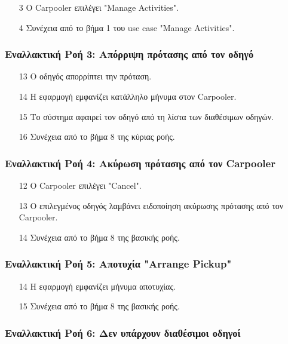 \begin{enumerate}
    \item[3] O Carpooler επιλέγει "Manage Activities".
    \item[4] Συνέχεια από το βήμα 1 του use case "Manage Activities".
\end{enumerate}

\subsubsection{Εναλλακτική Ροή 3: Απόρριψη πρότασης από τον οδηγό}

\begin{enumerate}
    \item[13] Ο οδηγός απορρίπτει την πρόταση.
    \item[14] Η εφαρμογή εμφανίζει κατάλληλο μήνυμα στον Carpooler.
    \item[15] Το σύστημα αφαιρεί τον οδηγό από τη λίστα των διαθέσιμων οδηγών.
    \item[16] Συνέχεια από το βήμα 8 της κύριας ροής.
\end{enumerate}

\subsubsection{Εναλλακτική Ροή 4: Ακύρωση πρότασης από τον Carpooler}

\begin{enumerate}
    \item[12] O Carpooler επιλέγει "Cancel".
    \item[13] Ο επιλεγμένος οδηγός λαμβάνει ειδοποίηση ακύρωσης πρότασης από τον Carpooler.
    \item[14] Συνέχεια από το βήμα 8 της βασικής ροής.
\end{enumerate}

\subsubsection{Εναλλακτική Ροή 5: Αποτυχία "Arrange Pickup"}

\begin{enumerate}
    \item[14] Η εφαρμογή εμφανίζει μήνυμα αποτυχίας.
    \item[15] Συνέχεια από το βήμα 8 της βασικής ροής.
\end{enumerate}

\subsubsection{Εναλλακτική Ροή 6: Δεν υπάρχουν διαθέσιμοι οδηγοί}

